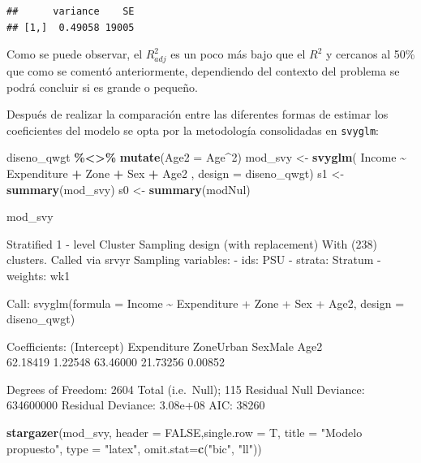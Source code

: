 \documentclass[
  12pt,
]{book}
\newenvironment{Shaded}{\begin{snugshade}}{\end{snugshade}}
\newcommand{\AttributeTok}[1]{\textcolor[rgb]{0.13,0.29,0.53}{#1}}
\newcommand{\ConstantTok}[1]{\textcolor[rgb]{0.56,0.35,0.01}{#1}}
\newcommand{\DecValTok}[1]{\textcolor[rgb]{0.00,0.00,0.81}{#1}}
\newcommand{\FunctionTok}[1]{\textcolor[rgb]{0.13,0.29,0.53}{\textbf{#1}}}
\newcommand{\NormalTok}[1]{#1}
\newcommand{\OtherTok}[1]{\textcolor[rgb]{0.56,0.35,0.01}{#1}}
\newcommand{\SpecialCharTok}[1]{\textcolor[rgb]{0.81,0.36,0.00}{\textbf{#1}}}
\newcommand{\StringTok}[1]{\textcolor[rgb]{0.31,0.60,0.02}{#1}}
\begin{document}
\begin{verbatim}
##      variance    SE
## [1,]  0.49058 19005
\end{verbatim}

Como se puede observar, el \(R_{adj}^{2}\) es un poco más bajo que el \(R^{2}\) y cercanos al 50\% que como se comentó anteriormente, dependiendo del contexto del problema se podrá concluir si es grande o pequeño.

Después de realizar la comparación entre las diferentes formas de estimar los coeficientes del modelo se opta por la metodología consolidadas en \texttt{svyglm}:

\begin{Shaded}
\begin{Highlighting}[]
\NormalTok{diseno\_qwgt }\SpecialCharTok{\%\textless{}\textgreater{}\%} \FunctionTok{mutate}\NormalTok{(}\AttributeTok{Age2 =}\NormalTok{ Age}\SpecialCharTok{\^{}}\DecValTok{2}\NormalTok{)}
\NormalTok{mod\_svy }\OtherTok{\textless{}{-}} \FunctionTok{svyglm}\NormalTok{( Income }\SpecialCharTok{\textasciitilde{}}\NormalTok{ Expenditure }\SpecialCharTok{+}\NormalTok{ Zone }\SpecialCharTok{+}\NormalTok{ Sex }\SpecialCharTok{+}\NormalTok{ Age2 ,}
                       \AttributeTok{design =}\NormalTok{ diseno\_qwgt)}
\NormalTok{s1 }\OtherTok{\textless{}{-}} \FunctionTok{summary}\NormalTok{(mod\_svy)}
\NormalTok{s0 }\OtherTok{\textless{}{-}} \FunctionTok{summary}\NormalTok{(modNul)}

\NormalTok{mod\_svy}
\end{Highlighting}
\end{Shaded}

Stratified 1 - level Cluster Sampling design (with replacement)
With (238) clusters.
Called via srvyr
Sampling variables:
- ids: PSU
- strata: Stratum
- weights: wk1

Call: svyglm(formula = Income \textasciitilde{} Expenditure + Zone + Sex + Age2, design = diseno\_qwgt)

Coefficients:
(Intercept) Expenditure ZoneUrban SexMale Age2\\
62.18419 1.22548 63.46000 21.73256 0.00852

Degrees of Freedom: 2604 Total (i.e.~Null); 115 Residual
Null Deviance: 634600000
Residual Deviance: 3.08e+08 AIC: 38260

\begin{Shaded}
\begin{Highlighting}[]
\FunctionTok{stargazer}\NormalTok{(mod\_svy, }\AttributeTok{header =} \ConstantTok{FALSE}\NormalTok{,}\AttributeTok{single.row =}\NormalTok{ T,}
           \AttributeTok{title =} \StringTok{"Modelo propuesto"}\NormalTok{,}
           \AttributeTok{type =} \StringTok{"latex"}\NormalTok{,  }\AttributeTok{omit.stat=}\FunctionTok{c}\NormalTok{(}\StringTok{"bic"}\NormalTok{, }\StringTok{"ll"}\NormalTok{))}
\end{Highlighting}
\end{Shaded}
\end{document}

